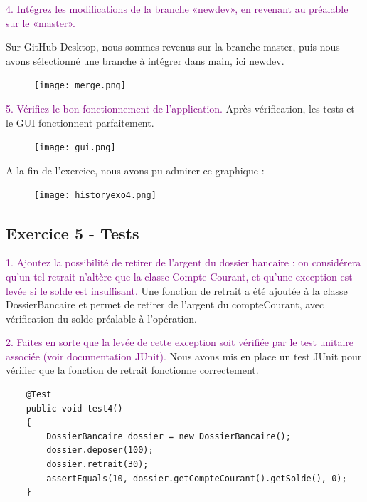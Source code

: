 \documentclass{article}
\begin{document}
\bigskip

\textcolor{Purple}{4. Intégrez les modifications de la branche «newdev», en revenant au préalable sur le «master».}
\newline

Sur GitHub Desktop, nous sommes revenus sur la branche master, puis nous avons sélectionné une branche à intégrer dans main, ici newdev.




\begin{figure}[!h]
\texttt{[image: merge.png]}
\end{figure}


\bigskip
\newpage
\bigskip

\textcolor{Purple}{5. Vérifiez le bon fonctionnement de l’application.}
\newline
Après vérification, les tests et le GUI fonctionnent parfaitement.

\begin{figure}[!h]
\texttt{[image: gui.png]}
\end{figure}
\newpage
A la fin de l'exercice, nous avons pu admirer ce graphique :

\begin{figure}[h]
\texttt{[image: historyexo4.png]}
\end{figure}
\newpage
\newpage
\subsection{Exercice 5 - Tests}
\bigskip

\textcolor{Purple}{1. Ajoutez la possibilité de retirer de l’argent du dossier bancaire : on considérera qu’un tel retrait n’altère que la classe Compte Courant, et qu’une exception est levée si le solde
est insuffisant.}
\newline
Une fonction de retrait a été ajoutée à la classe DossierBancaire et permet de retirer de l'argent du compteCourant, avec vérification du solde préalable à l'opération.

\bigskip

\textcolor{Purple}{2. Faites en sorte que la levée de cette exception soit vérifiée par le test unitaire associée
(voir documentation JUnit).}
\newline
Nous avons mis en place un test JUnit pour vérifier que la fonction de retrait fonctionne correctement.
\begin{lstlisting}
    @Test  
	public void test4()
	{
		DossierBancaire dossier = new DossierBancaire();
		dossier.deposer(100);
		dossier.retrait(30);
		assertEquals(10, dossier.getCompteCourant().getSolde(), 0);
	}
\end{lstlisting}
\end{document}
